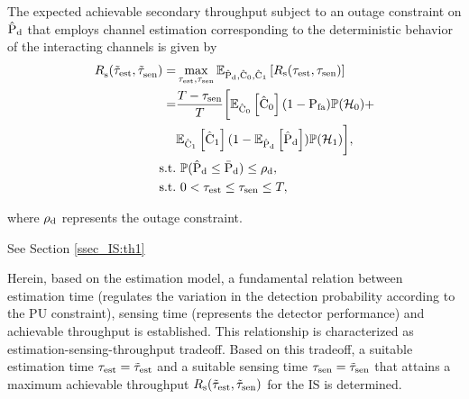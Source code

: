 \begin{theorem} \label{th_IS:th2}
\normalfont
The expected achievable secondary throughput subject to an outage constraint on $\hat{\text{P}}_{\text{d}}$ that employs channel estimation corresponding to the deterministic behavior of the interacting channels is given by  
\begin{align}
{R}_{\text{s}}^{\text{}}(\tilde{\tau}_{\text{est}}, \tilde{\tau}_{\text{sen}}^{\text{}}) =& \operatorname*{max}_{\tau_{\text{est}}, \tau_{\text{sen}}} {\mathbb E}_{\hat{\text{P}}_{\text{d}}, \hat{\text{C}}_{\text{0}}, \hat{\text{C}}_{\text{1}}}\left[ R_{\text{s}}(\tau_{\text{est}}, \tau_{\text{sen}}) \right] \nonumber \\ 
\quad =& \frac{T- \tau_{\text{sen}}}{T} \bigg[ {\mathbb E}_{\hat{\text{C}}_{\text{0}}}\left[ \hat{\text{C}}_{\text{0}} \right] (1 - \text{P}_{\text{fa}}) \mathbb P(\mathcal{H}_0) + \nonumber \\ \quad & {\mathbb E}_{\hat{\text{C}}_{\text{1}}}\left[ \hat{\text{C}}_{\text{1}} \right] (1 - {\mathbb E}_{\hat{\text{P}}_{\text{d}}}\left[ \hat{\text{P}}_{\text{d}} \right]) \mathbb P(\mathcal{H}_1)  \bigg], \label{eq_IS:thr_OC} \\
\text{s.t.} & \text{ }  \mathbb P(\hat{\text{P}}_{\text{d}} \le \bar{\text{P}}_{\text{d}}) \le \rho_{\text{d}}, \label{eq_IS:OC} \\
\text{s.t.} & \text{ }  0 < \tau_{\text{est}} \le \tau_{\text{sen}} \le T, \nonumber
\end{align}
\end{theorem} 
where $\rho_{\text{d}}$ represents the outage constraint. 

\begin{IEEEproof}[Solution] 
See Section \ref{ssec_IS:th1}
\end{IEEEproof} 


\begin{remark} \label{rem_IS:rem1}
\normalfont
Herein, based on the estimation model, a fundamental relation between estimation time (regulates the variation in the detection probability according to the PU constraint), sensing time (represents the detector performance) and achievable throughput is established. This relationship is characterized as estimation-sensing-throughput tradeoff. Based on this tradeoff, a suitable estimation time $\tau_{\text{est}} = \tilde{\tau}_{\text{est}}$ and a suitable sensing time $\tau_{\text{sen}} = \tilde{\tau}_{\text{sen}}$ that attains a maximum achievable throughput $R_{\text{s}}(\tilde{\tau}_{\text{est}},\tilde{\tau}_{\text{sen}})$ for the IS is determined.  
\end{remark}

